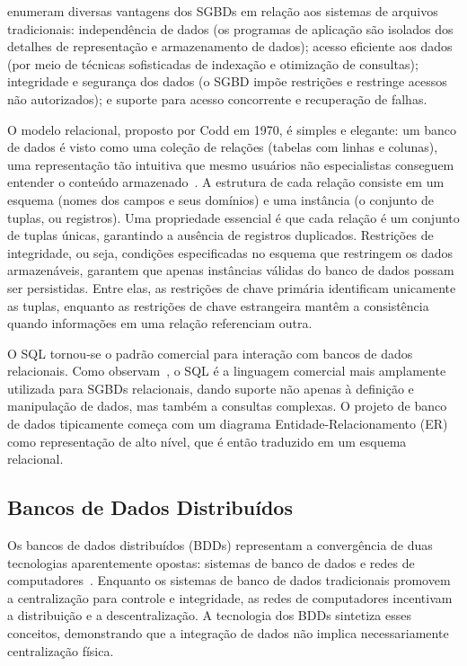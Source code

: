 \cite{Ramakrishnan2003} enumeram diversas vantagens dos SGBDs em relação aos sistemas de arquivos
tradicionais: independência de dados (os programas de aplicação são isolados dos detalhes de
representação e armazenamento de dados); acesso eficiente aos dados (por meio de técnicas
sofisticadas de indexação e otimização de consultas); integridade e segurança dos dados (o SGBD
impõe restrições e restringe acessos não autorizados); e suporte para acesso concorrente e
recuperação de falhas.

O modelo relacional, proposto por Codd em 1970, é simples e elegante: um banco de dados é visto
como uma coleção de relações (tabelas com linhas e colunas), uma representação tão intuitiva
que mesmo usuários não especialistas conseguem entender o conteúdo armazenado~\cite{Ramakrishnan2003}.
A estrutura de cada relação consiste em um esquema (nomes dos campos e seus domínios) e uma
instância (o conjunto de tuplas, ou registros). Uma propriedade essencial é que cada relação é
um conjunto de tuplas únicas, garantindo a ausência de registros duplicados. Restrições de
integridade, ou seja, condições especificadas no esquema que restringem os dados armazenáveis,
garantem que apenas instâncias válidas do banco de dados possam ser persistidas. Entre elas,
as restrições de chave primária identificam unicamente as tuplas, enquanto as restrições de
chave estrangeira mantêm a consistência quando informações em uma relação referenciam outra.

O SQL tornou-se o padrão comercial para interação com bancos de dados relacionais.
Como observam~\cite{Ramakrishnan2003}, o SQL é a linguagem comercial mais amplamente utilizada
para SGBDs relacionais, dando suporte não apenas à definição e manipulação de dados, mas também
a consultas complexas. O projeto de banco de dados tipicamente começa com um diagrama
Entidade-Relacionamento (ER) como representação de alto nível, que é então traduzido em um
esquema relacional.

\subsection{Bancos de Dados Distribuídos}

Os bancos de dados distribuídos (BDDs) representam a convergência de duas tecnologias
aparentemente opostas: sistemas de banco de dados e redes de computadores~\cite{Ozsu2011}.
Enquanto os sistemas de banco de dados tradicionais promovem a centralização para controle e
integridade, as redes de computadores incentivam a distribuição e a descentralização. A tecnologia
dos BDDs sintetiza esses conceitos, demonstrando que a integração de dados não implica
necessariamente centralização física.

